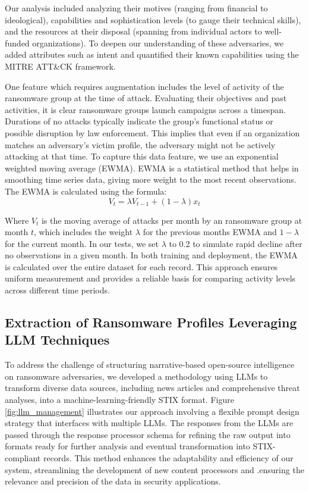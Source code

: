 \documentclass[running heads]{llncs}
\begin{document}
Our analysis included analyzing their motives (ranging from financial to ideological), capabilities and sophistication levels (to gauge their technical skills), and the resources at their disposal (spanning from individual actors to well-funded organizations). To deepen our understanding of these adversaries, we added attributes such as intent and quantified their known capabilities using the MITRE ATT\&CK framework. 

One feature which requires augmentation includes the level of activity of the ransomware group at the time of attack. Evaluating their objectives and past activities, it is clear ransomware groups launch campaigns across a timespan. Durations of no attacks typically indicate the group's functional status or possible disruption by law enforcement. This implies that even if an organization matches an adversary's victim profile, the adversary might not be actively attacking at that time. To capture this data feature, we use an exponential weighted moving average (EWMA). EWMA is a statistical method that helps in smoothing time series data, giving more weight to the most recent observations. The EWMA is calculated using the formula:
\begin{equation}
V_t = \lambda V_{t-1} + (1-\lambda) x_t
\end{equation}

Where $V_t$ is the moving average of attacks per month by an ransomware group at month $t$, which includes the weight $\lambda$ for the previous months EWMA and $1-\lambda$ for the current month. In our tests, we set $\lambda$ to 0.2 to simulate rapid decline after no observations in a given month. In both training and deployment, the EWMA is calculated over the entire dataset for each record. This approach ensures uniform measurement and provides a reliable basis for comparing activity levels across different time periods.

\subsection{Extraction of Ransomware Profiles Leveraging LLM Techniques}

To address the challenge of structuring narrative-based open-source intelligence on ransomware adversaries, we developed a methodology using LLMs to transform diverse data sources, including news articles and comprehensive threat analyses, into a machine-learning-friendly STIX format. Figure \ref{fig:llm_management} illustrates our approach involving a flexible prompt design strategy that interfaces with multiple LLMs. The responses from the LLMs are passed through the response processor schema for refining the raw output into formats ready for further analysis and eventual transformation into STIX-compliant records. This method enhances the adaptability and efficiency of our system, streamlining the development of new content processors and .ensuring the relevance and precision of the data in security applications.
\end{document}
